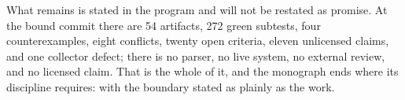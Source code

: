 What remains is stated in the program and will not be restated as promise. At the bound commit there are 54 artifacts, 272 green subtests, four counterexamples, eight conflicts, twenty open criteria, eleven unlicensed claims, and one collector defect; there is no parser, no live system, no external review, and no licensed claim. That is the whole of it, and the monograph ends where its discipline requires: with the boundary stated as plainly as the work.
